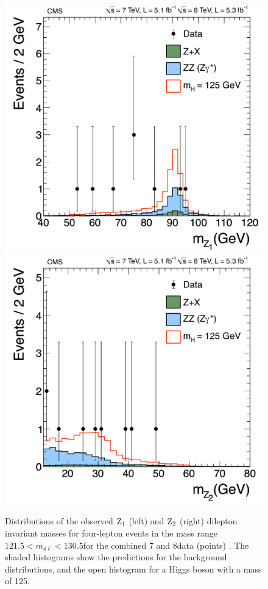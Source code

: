 \documentclass[12pt,twoside,a4paper,cmspaper,final,collab]{cms-tdr}
\begin{document}
\begin{figure}[htbp]
   \begin{center}
     \includegraphics[width=0.45\linewidth]{figures/HZZ_MZ1_MainThreeBins_MH125}
     \includegraphics[width=0.45\linewidth]{figures/HZZ_MZ2_MainThreeBins_MH125}
     \caption{
     Distributions of the observed $\mathrm{Z}_1$ (left) and $\mathrm{Z}_2$ (right) dilepton invariant
     masses for four-lepton events in the mass range
     $121.5 < m_{4\ell} < 130.5$\GeV for the combined 7 and 8\TeV data (points) .
     The shaded histograms show the predictions for the background distributions, and the open histogram for
     a Higgs boson with a mass of 125\GeV.
     }
\label{fig:Z1Z2masses}
   \end{center}
\end{figure}
\end{document}

